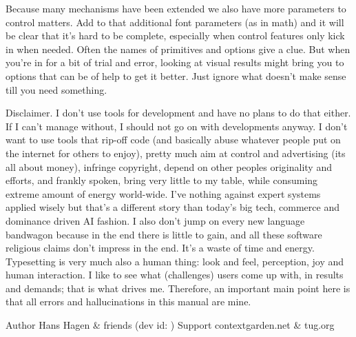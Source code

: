 Because many mechanisms have been extended we also have more parameters to
control matters. Add to that additional font parameters (as in math) and it will
be clear that it's hard to be complete, especially when control features only
kick in when needed. Often the names of primitives and options give a clue. But
when you're in for a bit of trial and error, looking at visual results might
bring you to options that can be of help to get it better. Just ignore what
doesn't make sense till you need something.

\start \switchtobodyfont[small] \setupinterlinespace

Disclaimer. I don't use  tools for development
and have no plans to do that either. If I can't manage without, I should not go
on with developments anyway. I don't want to use tools that rip-off code (and
basically abuse whatever people put on the internet for others to enjoy), pretty
much aim at control and advertising (its all about money), infringe copyright,
depend on other peoples originality and efforts, and frankly spoken, bring very
little to my table, while consuming extreme amount of energy world-wide. I've
nothing against expert systems applied wisely but that's a different story than
today's big tech, commerce and dominance driven AI fashion. I also don't jump on
every new language bandwagon because in the end there is little to gain, and all
these software religious claims don't impress in the end. It's a waste of time
and energy. Typesetting is very much also a human thing: look and feel,
perception, joy and human interaction. I like to see what (challenges) users come
up with, in results and demands; that is what drives me. Therefore, an important
main point here is that all errors and hallucinations in this manual are mine.

\par \stop

\starttabulate[|||]
    \NC Author      \NC Hans Hagen & friends        \NC \NR
    \NC \CONTEXT    \NC \contextversion             \NC \NR
    \NC \LUAMETATEX \NC \luametatexverboseversion   %
                        \space (dev id: \luametatexfunctionality)  \NC \NR
    \NC Support     \NC contextgarden.net & tug.org \NC \NR
\stoptabulate

\stopdocument
